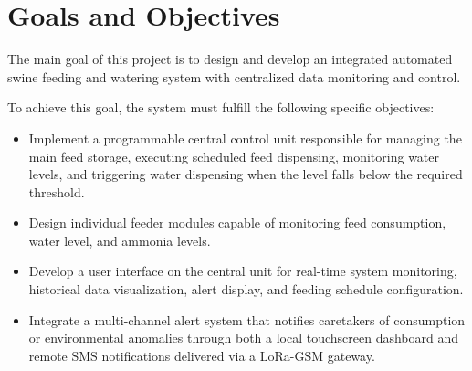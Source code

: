 \section{Goals and Objectives}

The main goal of this project is to design and develop an integrated automated swine feeding and watering system with centralized data monitoring and control.

To achieve this goal, the system must fulfill the following specific objectives:

\begin{itemize}
  \item Implement a programmable central control unit responsible for managing the main feed storage, executing scheduled feed dispensing, monitoring water levels, and triggering water dispensing when the level falls below the required threshold.
  \item Design individual feeder modules capable of monitoring feed consumption, water level, and ammonia levels.
  \item Develop a user interface on the central unit for real-time system monitoring, historical data visualization, alert display, and feeding schedule configuration.
  \item Integrate a multi-channel alert system that notifies caretakers of consumption or environmental anomalies through both a local touchscreen dashboard and remote SMS notifications delivered via a LoRa-GSM gateway.
\end{itemize}
